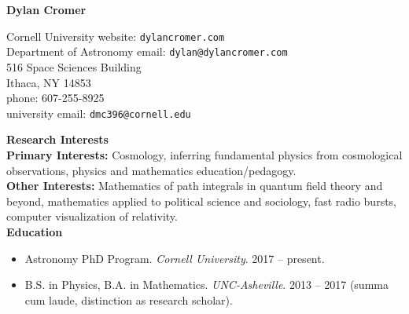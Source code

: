 \documentclass[a4paper, 11pt]{article}
\title{}
\author{}
\date{Last Edited: \today}
\newcommand{\myrule}{\hrulefill}
\newcommand{\noi}{\noindent}
\begin{document}
\begin{center} 
\textbf{Dylan Cromer} 
\\
\myrule
\end{center}

\noi Cornell University \hfill website: \texttt{dylancromer.com}
\\
Department of Astronomy \hfill email: \texttt{dylan@dylancromer.com}
\\
516 Space Sciences Building \hfill
\\
Ithaca, NY 14853 \hfill
\\
phone: 607-255-8925 \hfill
\\
university email: \texttt{dmc396@cornell.edu} \hfill
\\

\fancyfoot{\myrule \\ Dylan Cromer \hfill \thepage}

\noi \textbf{Research Interests}
\\

\noi \textbf{Primary Interests:} Cosmology, inferring fundamental physics from cosmological observations, physics and mathematics education/pedagogy.
\\

\noi \textbf{Other Interests:} Mathematics of path integrals in quantum field theory and beyond, mathematics applied to political science and sociology, fast radio bursts, computer visualization of relativity.
\\

\noi \textbf{Education}
\begin{itemize}[leftmargin=*]
\item Astronomy PhD Program. \emph{Cornell University}. 2017 -- present.
	\item \noi B.S. in Physics, B.A. in Mathematics. \emph{UNC-Asheville}. 2013 -- 2017 (summa cum laude, distinction as research scholar). 
\end{itemize}
\end{document}
